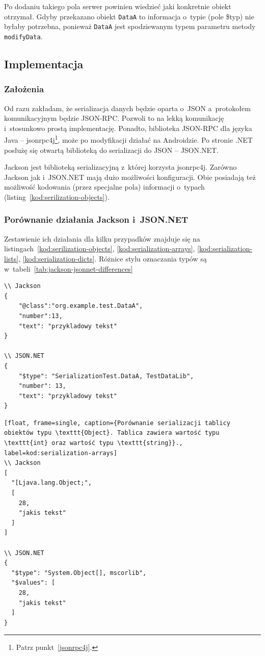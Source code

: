 Po dodaniu takiego pola serwer powinien wiedzieć jaki konkretnie obiekt otrzymał.
Gdyby przekazano obiekt \texttt{DataA} to informacja o~typie (pole \$typ) nie byłaby potrzebna, ponieważ \texttt{DataA} jest spodziewanym typem parametru metody \texttt{modifyData}.


\subsection{Implementacja}
\subsubsection{Założenia}
Od razu zakładam, że serializacja danych będzie oparta o~JSON a~protokołem komunikacyjnym będzie JSON-RPC. Pozwoli to na lekką komunikację i~stosunkowo prostą implementację.
Ponadto, biblioteka JSON-RPC dla języka Java -- jsonrpc4j\footnote{Patrz punkt~\ref{jsonrpc4j}.}, może po modyfikacji działać na Androidzie.
Po stronie .NET posłużę się otwartą biblioteką do serializacji do JSON -- JSON.NET.

Jackson jest biblioteką serializacyjną z~której korzysta jsonrpc4j. Zarówno Jackson jak i~JSON.NET mają dużo możliwości konfiguracji. Obie posiadają też możliwość kodowania (przez specjalne pola) informacji o~typach (listing~\ref{kod:serilization-objects}).

\subsubsection{Porównanie działania Jackson i~JSON.NET}
Zestawienie ich działania dla kilku przypadków znajduje się na listingach~\ref{kod:serilization-objects}, \ref{kod:serialization-arrays}, \ref{kod:serialization-lists}, \ref{kod:serialization-dicts}. Różnice stylu oznaczania typów są w~tabeli~\ref{tab:jackson-jsonnet-differences}

\begin{lstlisting}[float, frame=single, caption={Porównanie serializacji obiektów typu \texttt{DataA}}, label=kod:serilization-objects]
\\ Jackson
{
    "@class":"org.example.test.DataA",
    "number":13,
    "text": "przykladowy tekst"
}

\\ JSON.NET
{
    "$type": "SerializationTest.DataA, TestDataLib",
    "number": 13,
    "text": "przykladowy tekst"
}
\end{lstlisting}

\begin{lstlisting}[float, frame=single, caption={Porównanie serializacji tablicy obiektów typu \texttt{Object}. Tablica zawiera wartość typu \texttt{int} oraz wartość typu \texttt{string}}., label=kod:serialization-arrays]
\\ Jackson
[
  "[Ljava.lang.Object;",
  [
    28,
    "jakis tekst"
  ]
]

\\ JSON.NET
{
  "$type": "System.Object[], mscorlib",
  "$values": [
    28,
    "jakis tekst"
  ]
}
\end{lstlisting}

